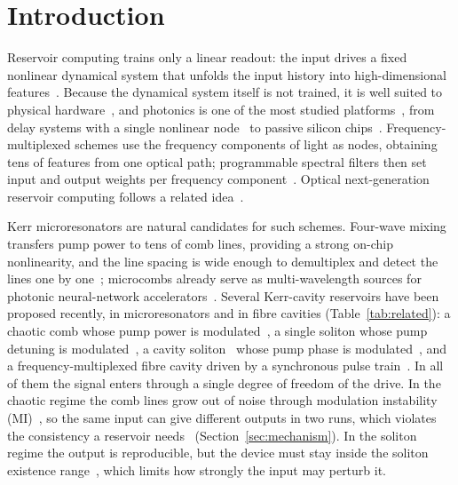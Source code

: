 \section{Introduction}\label{sec:intro}

Reservoir computing trains only a linear readout: the input drives a fixed nonlinear dynamical system that unfolds the input
history into high-dimensional features~\cite{jaeger2001,jaeger2004}. Because the dynamical system itself is not trained, it is
well suited to physical hardware~\cite{tanaka2019}, and photonics is one of the most studied platforms~\cite{vandersande2017,shastri2021},
from delay systems with a single nonlinear node~\cite{appeltant2011,larger2012,paquot2012,brunner2013} to passive silicon
chips~\cite{vandoorne2014}.
Frequency-multiplexed schemes use the frequency components of light as nodes, obtaining tens of features from one optical path;
programmable spectral filters then set input and output weights per frequency
component~\cite{butschek2020,lupo2021,lupo2023}. Optical next-generation reservoir computing follows a related
idea~\cite{cox2024,wang2025ngrc}.

Kerr microresonators are natural candidates for such schemes. Four-wave mixing transfers pump power to tens of comb lines,
providing a strong on-chip nonlinearity, and the line spacing is wide enough to demultiplex and detect the lines one by
one~\cite{kippenberg2018,pasquazi2018}; microcombs already serve as multi-wavelength sources for photonic neural-network
accelerators~\cite{xu2021,feldmann2021}. Several Kerr-cavity reservoirs have been proposed recently, in microresonators and in fibre cavities (Table~\ref{tab:related}): a chaotic
comb whose pump power is modulated~\cite{shishavan2025}, a single soliton whose pump detuning is modulated~\cite{cuevas2025}, a
cavity soliton~\cite{leo2010} whose pump phase is modulated~\cite{arabieh2026soliton}, and a frequency-multiplexed fibre cavity driven by a
synchronous pulse train~\cite{arabieh2026pulse}. In all of them the signal enters through a single degree of freedom of the drive.
In the chaotic regime the comb lines grow out of noise through modulation instability (MI)~\cite{haelterman1992}, so the same input can give different
outputs in two runs, which violates the consistency a reservoir needs~\cite{uchida2004,jaeger2001}
(Section~\ref{sec:mechanism}). In the soliton regime the output is reproducible, but the device must stay inside the soliton
existence range~\cite{herr2014}, which limits how strongly the input may perturb it.

